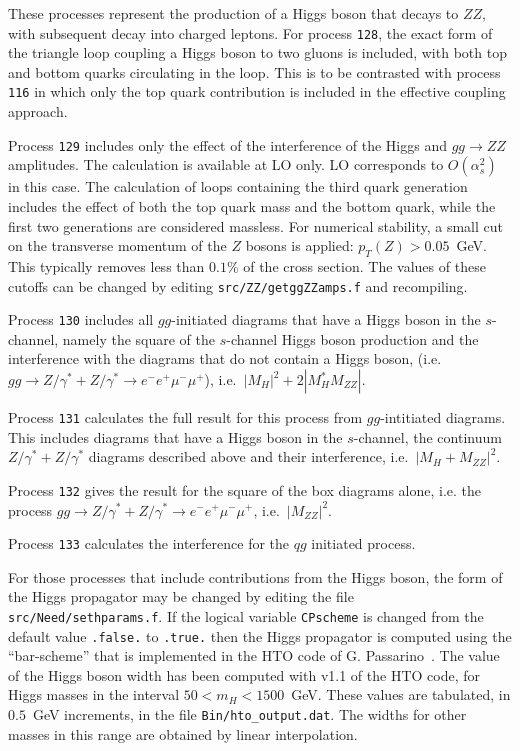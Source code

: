 These processes represent the production of a Higgs boson that decays to $Z Z$,
with subsequent decay into charged leptons. For process {\tt 128}, the exact form of the triangle
loop coupling a Higgs boson to two gluons is included, with both top and bottom quarks
circulating in the loop. This is to be contrasted with process {\tt 116} in which only the
top quark contribution is included in the effective coupling approach.

Process {\tt 129} includes only the effect of the interference of the
Higgs and $gg \to ZZ$ amplitudes.
The calculation is available at LO only. LO corresponds to $O(\alpha_s^2)$ in this case.
The calculation of loops containing the third quark generation
includes the effect of both the top quark mass and the bottom quark, while the first two
generations are considered massless. For numerical stability, a small cut on the
transverse momentum of the $Z$ bosons is applied: $p_T(Z)>0.05$~GeV.
This typically removes less than $0.1$\% of the cross section. The
values of these cutoffs can be changed by editing \verb|src/ZZ/getggZZamps.f| and recompiling.

Process {\tt 130} includes all $gg$-initiated diagrams that have a Higgs boson in the $s$-channel,
namely the square of the $s$-channel Higgs boson production and the interference with the diagrams
that do not contain a Higgs boson, (i.e. $gg \to Z/\gamma^*+Z/\gamma^* \to e^- e^+ \mu^- \mu^+$),
i.e.~$|M_H|^2+2 |M_H^* M_{ZZ}|$.

Process {\tt 131} calculates the full result for this process from  $gg$-intitiated diagrams.
This includes diagrams that have a Higgs boson in the $s$-channel, the continuum $ Z/\gamma^*+Z/\gamma^*$
diagrams described above and their interference, i.e.~$|M_H+M_{ZZ}|^2$.


Process {\tt 132}  gives the result for the square of the box diagrams alone, i.e. the process
$gg \to Z/\gamma^*+Z/\gamma^* \to e^- e^+ \mu^- \mu^+$, i.e.~$|M_{ZZ}|^2$.

Process {\tt 133} calculates the interference for the $qg$ initiated process.

For those processes that include contributions from the Higgs boson, the form
of the Higgs propagator may be changed by editing the file
{\tt src/Need/sethparams.f}.  If the logical variable {\tt CPscheme} is
changed from the default value {\tt .false.} to {\tt .true.} then the
Higgs propagator is computed using the ``bar-scheme'' that is
implemented in the HTO code of G. Passarino~\cite{Goria:2011wa,Passarino:2010qk}.
The value of the Higgs boson width has been computed with v1.1 of the
HTO code, for Higgs masses in the interval $50 < m_H< 1500$~GeV.  These
values are tabulated, in $0.5$~GeV increments, in the file
{\tt Bin/hto\_output.dat}.  The widths for other masses in this range
are obtained by linear interpolation.

